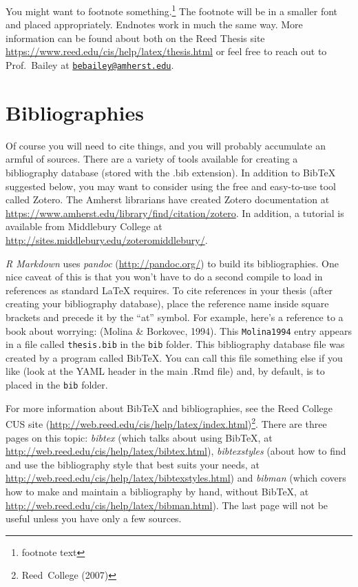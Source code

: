\documentclass[12pt, twoside]{amherstthesis}
\theoremstyle{definition}
\theoremstyle{definition}
\theoremstyle{definition}
\theoremstyle{remark}
\begin{document}
You might want to footnote something.\footnote{footnote text} The footnote will be in a smaller font and placed appropriately. Endnotes work in much the same way. More information can be found about both on the Reed Thesis site \url{https://www.reed.edu/cis/help/latex/thesis.html} or feel free to reach out to Prof.~Bailey at \href{mailto:bebailey@amherst.edu}{\nolinkurl{bebailey@amherst.edu}}.

\hypertarget{bibliographies}{%
\section{Bibliographies}\label{bibliographies}}

Of course you will need to cite things, and you will probably accumulate an armful of sources. There are a variety of tools available for creating a bibliography database (stored with the .bib extension). In addition to BibTeX suggested below, you may want to consider using the free and easy-to-use tool called Zotero. The Amherst librarians have created Zotero documentation at \url{https://www.amherst.edu/library/find/citation/zotero}. In addition, a tutorial is available from Middlebury College at \url{http://sites.middlebury.edu/zoteromiddlebury/}.

\emph{R Markdown} uses \emph{pandoc} (\url{http://pandoc.org/}) to build its bibliographies. One nice caveat of this is that you won't have to do a second compile to load in references as standard LaTeX requires. To cite references in your thesis (after creating your bibliography database), place the reference name inside square brackets and precede it by the ``at'' symbol. For example, here's a reference to a book about worrying: (Molina \& Borkovec, 1994). This \texttt{Molina1994} entry appears in a file called \texttt{thesis.bib} in the \texttt{bib} folder. This bibliography database file was created by a program called BibTeX. You can call this file something else if you like (look at the YAML header in the main .Rmd file) and, by default, is to placed in the \texttt{bib} folder.

For more information about BibTeX and bibliographies, see the Reed College CUS site (\url{http://web.reed.edu/cis/help/latex/index.html})\footnote{Reed~College (2007)}. There are three pages on this topic: \emph{bibtex} (which talks about using BibTeX, at \url{http://web.reed.edu/cis/help/latex/bibtex.html}), \emph{bibtexstyles} (about how to find and use the bibliography style that best suits your needs, at \url{http://web.reed.edu/cis/help/latex/bibtexstyles.html}) and \emph{bibman} (which covers how to make and maintain a bibliography by hand, without BibTeX, at \url{http://web.reed.edu/cis/help/latex/bibman.html}). The last page will not be useful unless you have only a few sources.
\end{document}
